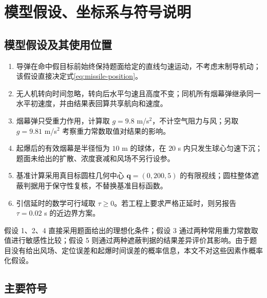 \documentclass[UTF8,a4paper,12pt,fontset=windows]{ctexart}
\begin{document}
\section{模型假设、坐标系与符号说明}

\subsection{模型假设及其使用位置}

\begin{enumerate}
  \item 导弹在命中假目标前始终保持题面给定的直线匀速运动，不考虑末制导机动；该假设直接决定式\eqref{eq:missile-position}。
  \item 无人机转向时间忽略，转向后水平匀速且高度不变；同机所有烟幕弹继承同一水平初速度，并由结果表回算共享航向和速度。
  \item 烟幕弹只受重力作用，计算取 $g=9.8$ m/s$^2$，不计空气阻力与风；另取 $g=9.81$ m/s$^2$ 考察重力常数取值对结果的影响。
  \item 起爆后的有效烟幕是半径恒为 $10$ m 的球体，在 $20$ s 内只发生球心匀速下沉；题面未给出的扩散、浓度衰减和风场不另行设参。
  \item 基准计算采用真目标圆柱几何中心 $\bm q=(0,200,5)$ 的有限视线；圆柱整体遮蔽判据用于保守性复核，不替换基准目标函数。
  \item 引信延时的数学可行域取 $\tau\geq0$。若工程上要求严格正延时，则另报告 $\tau=0.02$ s 的近边界方案。
\end{enumerate}

假设 1、2、4 直接采用题面给出的理想化条件；假设 3 通过两种常用重力常数取值进行敏感性比较；假设 5 则通过两种遮蔽判据的结果差异评价其影响。由于题目没有给出风场、定位误差和起爆时间误差的概率信息，本文不对这些因素作概率化假设。

\subsection{主要符号}
\end{document}
